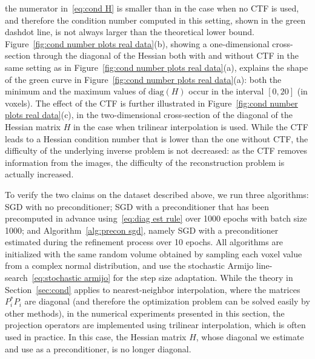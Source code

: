 \documentclass{article}
\begin{document}
the numerator in~\eqref{eq:cond H} is smaller than in the 
case when no CTF is used, and therefore the condition number computed in this setting, 
shown in the green dashdot line, is not always larger than the theoretical lower bound.
Figure~\ref{fig:cond number plots real data}(b), showing a one-dimensional cross-section 
through the diagonal of the Hessian both with and without CTF in the same setting as 
in Figure~\ref{fig:cond number plots real data}(a), explains the shape of the
green curve in Figure~\ref{fig:cond number plots real data}(a): both the minimum
and the maximum values of $\text{diag}(H)$ occur in the interval $[0,20]$ (in voxels).
The effect of the CTF is further illustrated in Figure~\ref{fig:cond number plots real data}(c), 
in the two-dimensional cross-section of the diagonal of the Hessian matrix $H$ 
in the case when trilinear interpolation is used. 
While the CTF leads to a Hessian condition number that is lower than the one without CTF, the difficulty of the underlying inverse problem is not decreased: as the CTF removes information from the images, the difficulty of the reconstruction problem is actually increased.

To verify the two claims on the dataset described above, we run three algorithms:
SGD with no preconditioner; SGD with a preconditioner that has been precomputed 
in advance using~\eqref{eq:diag est rule} over 1000 epochs with batch size 1000; 
and Algorithm~\ref{alg:precon sgd}, namely SGD with a preconditioner estimated during the refinement process over 10 epochs.
All algorithms are initialized with the same random volume obtained by sampling
each voxel value from a complex normal distribution,
and use the stochastic Armijo line-search~\eqref{eq:stochastic armijo}
for the step size adaptation. While the theory in Section~\ref{sec:cond} applies 
to nearest-neighbor interpolation, where the matrices $P_i^* P_i$ are diagonal
(and therefore the optimization problem can be solved easily by other methods),
in the numerical experiments presented in this section, the projection operators
are implemented using trilinear interpolation, which is often used in practice. 
In this case, the Hessian matrix $H$, whose diagonal we estimate and use as a 
preconditioner, is no longer diagonal.

\end{document}
